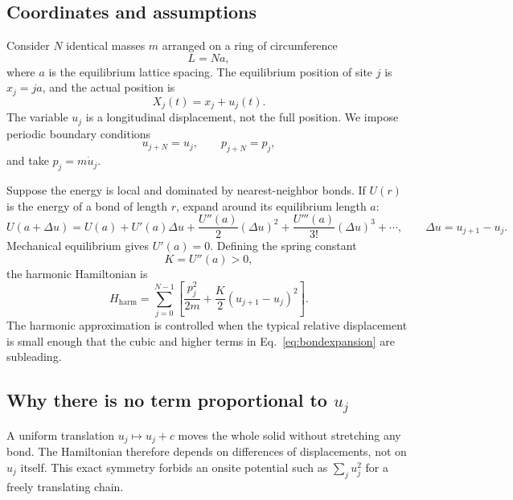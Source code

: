 \documentclass[11pt]{article}
\begin{document}
\subsection{Coordinates and assumptions}

Consider $N$ identical masses $m$ arranged on a ring of circumference
\begin{equation}
  L=Na,
\end{equation}
where $a$ is the equilibrium lattice spacing.  The equilibrium position of
site $j$ is $x_j=ja$, and the actual position is
\begin{equation}
  X_j(t)=x_j+u_j(t).
  \label{eq:actualposition}
\end{equation}
The variable $u_j$ is a longitudinal displacement, not the full position.
We impose periodic boundary conditions
\begin{equation}
  u_{j+N}=u_j,
  \qquad
  p_{j+N}=p_j,
\end{equation}
and take $p_j=m\dot u_j$.

Suppose the energy is local and dominated by nearest-neighbor bonds.  If
$U(r)$ is the energy of a bond of length $r$, expand around its equilibrium
length $a$:
\begin{equation}
  U(a+\Delta u)
  =U(a)+U'(a)\Delta u
  +\frac{U''(a)}{2}(\Delta u)^2
  +\frac{U'''(a)}{3!}(\Delta u)^3+\cdots,
  \qquad
  \Delta u=u_{j+1}-u_j.
  \label{eq:bondexpansion}
\end{equation}
Mechanical equilibrium gives $U'(a)=0$.  Defining the spring constant
\begin{equation}
  K=U''(a)>0,
\end{equation}
the harmonic Hamiltonian is
\begin{equation}
  \boxed{
  H_{\mathrm{harm}}
  =\sum_{j=0}^{N-1}
  \left[
    \frac{p_j^2}{2m}
    +\frac{K}{2}(u_{j+1}-u_j)^2
  \right].
  }
  \label{eq:latticeH}
\end{equation}
The harmonic approximation is controlled when the typical relative
displacement is small enough that the cubic and higher terms in
Eq.~\eqref{eq:bondexpansion} are subleading.

\subsection{Why there is no term proportional to \texorpdfstring{$u_j$}{u j}}

A uniform translation $u_j\mapsto u_j+c$ moves the whole solid without
stretching any bond.  The Hamiltonian therefore depends on differences of
displacements, not on $u_j$ itself.  This exact symmetry forbids an onsite
potential such as $\sum_j u_j^2$ for a freely translating chain.
\end{document}

